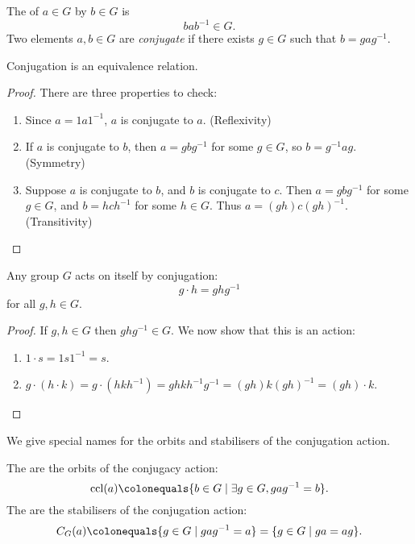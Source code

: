 \begin{definition}
The  of $a\in G$ by $b\in G$ is
\[bab^{-1}\in G.\]
Two elements $a,b\in G$ are \emph{conjugate} if there exists $g\in G$ such that $b=gag^{-1}$.
\end{definition}

\begin{lemma}
Conjugation is an equivalence relation.
\end{lemma}

\begin{proof}
There are three properties to check:
\begin{enumerate}[label=(\roman*)]
\item Since $a=1a1^{-1}$, $a$ is conjugate to $a$. (Reflexivity)
\item If $a$ is conjugate to $b$, then $a=gbg^{-1}$ for some $g\in G$, so $b=g^{-1}ag$. (Symmetry)
\item Suppose $a$ is conjugate to $b$, and $b$ is conjugate to $c$. Then $a=gbg^{-1}$ for some $g\in G$, and $b=hch^{-1}$ for some $h\in G$. Thus $a=(gh)c(gh)^{-1}$. (Transitivity)
\end{enumerate}
\end{proof}

\begin{lemma}
Any group $G$ acts on itself by conjugation:
\[g\cdot h=ghg^{-1}\]
for all $g,h\in G$.
\end{lemma}

\begin{proof}
If $g,h\in G$ then $ghg^{-1}\in G$. We now show that this is an action:
\begin{enumerate}[label=(\roman*)]
\item $1\cdot s=1s1^{-1}=s$.
\item $g\cdot(h\cdot k)=g\cdot(hkh^{-1})=ghkh^{-1}g^{-1}=(gh)k(gh)^{-1}=(gh)\cdot k$.
\end{enumerate}
\end{proof}

We give special names for the orbits and stabilisers of the conjugation action.

\begin{definition}
The  are the orbits of the conjugacy action:
\[\ccl(a)\colonequals\{b\in G\mid\exists g\in G, gag^{-1}=b\}.\]
The  are the stabilisers of the conjugation action:
\[C_G(a)\colonequals\{g\in G\mid gag^{-1}=a\}=\{g\in G\mid ga=ag\}.\]
\end{definition}

